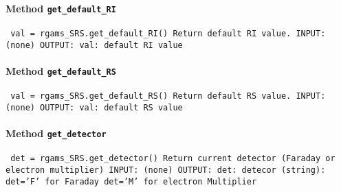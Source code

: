 \paragraph{Method \texttt{get_default_RI}}
\vspace{1ex}
\texttt{\newline
val = rgams_SRS.get_default_RI()\newline
\newline
Return default RI value.\newline
\newline
INPUT:\newline
(none)\newline
\newline
OUTPUT:\newline
val: default RI value\newline
\newline
}

\paragraph{Method \texttt{get_default_RS}}
\vspace{1ex}
\texttt{\newline
val = rgams_SRS.get_default_RS()\newline
\newline
Return default RS value.\newline
\newline
INPUT:\newline
(none)\newline
\newline
OUTPUT:\newline
val: default RS value\newline
\newline
}

\paragraph{Method \texttt{get_detector}}
\vspace{1ex}
\texttt{\newline
det = rgams_SRS.get_detector()\newline
\newline
Return current detector (Faraday or electron multiplier)\newline
\newline
INPUT:\newline
(none)\newline
\newline
OUTPUT:\newline
det: detecor (string):\newline
det='F' for Faraday\newline
det='M' for electron Multiplier\newline
\newline
}

